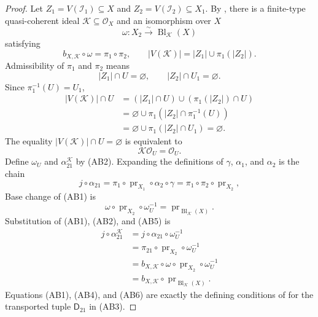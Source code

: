 \begin{proof}
  Let $Z_1=V(\mathcal I_1)\subseteq X$ and
  $Z_2=V(\mathcal I_2)\subseteq X_1$.  By
  , there is a finite-type
  quasi-coherent ideal $\mathcal K\subseteq\mathcal O_X$ and an isomorphism
  over $X$
  \[
    \omega\colon X_2\xrightarrow{\sim}\operatorname{Bl}_{\mathcal K}(X)
  \]
  satisfying
  \[
    b_{X,\mathcal K}\circ\omega=\pi_1\circ\pi_2,
    \qquad
    |V(\mathcal K)|=|Z_1|\cup\pi_1(|Z_2|).
  \]
  Admissibility of $\pi_1$ and $\pi_2$ means
  \[
    |Z_1|\cap U=\varnothing,
    \qquad
    |Z_2|\cap U_1=\varnothing.
  \]
  Since $\pi_1^{-1}(U)=U_1$,
  \[
  \begin{aligned}
    |V(\mathcal K)|\cap U
      &= (|Z_1|\cap U)\cup(\pi_1(|Z_2|)\cap U)\\
      &=\varnothing\cup
        \pi_1(|Z_2|\cap\pi_1^{-1}(U))\\
      &=\varnothing\cup\pi_1(|Z_2|\cap U_1)=\varnothing.
  \end{aligned}
  \]
  The equality
  $|V(\mathcal K)|\cap U=\varnothing$ is equivalent to
  \[
    \mathcal K\mathcal O_U=\mathcal O_U.                        \tag{AB4}
  \]
  Define $\omega_U$ and $\alpha_{21}^{\mathcal K}$ by (AB2).  Expanding the
  definitions of $\gamma$, $\alpha_1$, and $\alpha_2$ is the chain
  \[
    j\circ\alpha_{21}
      =\pi_1\circ\operatorname{pr}_{X_1}\circ\alpha_2\circ\gamma
      =\pi_1\circ\pi_2\circ\operatorname{pr}_{X_2},
                                                                    \tag{AB5}
  \]
  Base change of (AB1) is
  \[
    \omega\circ\operatorname{pr}_{X_2}\circ\omega_U^{-1}
      =\operatorname{pr}_{\operatorname{Bl}_{\mathcal K}(X)}.
  \]
  Substitution of (AB1), (AB2), and (AB5) is
  \[
  \begin{aligned}
    j\circ\alpha_{21}^{\mathcal K}
      &=j\circ\alpha_{21}\circ\omega_U^{-1}\\
      &=\pi_{21}\circ\operatorname{pr}_{X_2}\circ\omega_U^{-1}\\
      &=b_{X,\mathcal K}\circ\omega\circ
          \operatorname{pr}_{X_2}\circ\omega_U^{-1}\\
      &=b_{X,\mathcal K}\circ
          \operatorname{pr}_{\operatorname{Bl}_{\mathcal K}(X)}.
  \end{aligned}                                                   \tag{AB6}
  \]
  Equations (AB1), (AB4), and (AB6) are exactly the defining conditions of
   for the transported tuple
  $\mathsf D_{21}$ in (AB3).
\end{proof}

